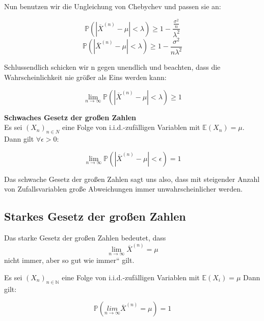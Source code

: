 {    Nun benutzen wir die Ungleichung von Chebychev und passen sie an:

    \[\mathbb P\left(\left|{\overline{X}}^{\left(n\right)}-\mu
    \right|<\lambda \right)\ge 1-\frac{\frac{\sigma ^{2}}{n}}{\lambda
    ^{2}}\]
    \[\mathbb P\left(\left|{\overline{X}}^{\left(n\right)}-\mu \right|<\lambda
    \right)\ge 1-\frac{\sigma ^{2}}{n\lambda ^{2}}\]

    Schlussendlich schicken wir n gegen unendlich und beachten, dass die
    Wahrscheinlichkeit nie größer als Eins werden kann:

    \[\lim_{n\rightarrow{\infty}}\mathbb P\left(\left|{\overline{X}}^{\left(n\right)}-\mu
    \right|<\lambda \right)\ge 1\]
    \begin{definition}\textbf{Schwaches Gesetz der großen Zahlen}\\
        Es sei $\left(X_{n}\right)_{n\in N}$ eine Folge von i.i.d.-zufälligen Variablen mit 
        $\mathbb E\left(X_{n}\right)=\mu$. Dann gilt $\forall\epsilon >0$:

    \[\lim_{n\rightarrow\infty}\mathbb P\left(\left|{\overline{X}}^{\left(n\right)}-\mu
    \right|<\epsilon \right)=1\]
    \end{definition}

    Das schwache Gesetz der großen Zahlen sagt uns also, dass mit
    steigender Anzahl von Zufallsvariablen große Abweichungen immer
    unwahrscheinlicher werden.


    \subsection{Starkes Gesetz der großen Zahlen}\label{sec:starkes_gesetz_grossen_zahlen}

    Das starke Gesetz der großen Zahlen bedeutet, dass
    \[\lim_{n\rightarrow\infty}{\overline{X}}^{\left(n\right)}=\mu\]
    nicht immer, aber {\quotedblbase}so gut wie immer{\textquotedblleft}
    gilt.

    \begin{definition}
    Es sei $\left(X_{n}\right)_{n\in \mathbb N}$ eine
    Folge von i.i.d.-zufälligen Variablen mit
    ${\mathbb E\left(X_{i}\right)=\mu}$
    Dann gilt:

    \[\mathbb P\left(\underset{n\rightarrow
    {\infty}}{{lim}}{\overline{X}}^{\left(n\right)}=\mu \right)=1\]


\end{definition}}
